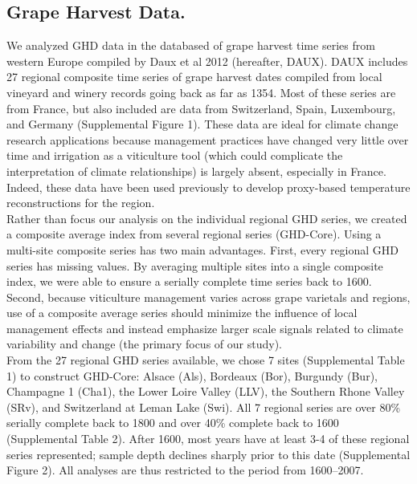 \documentclass[final]{nature}
\begin{document}
\begin{methods}
\subsection{Grape Harvest Data.}
\noindent We analyzed GHD data in the databased of grape harvest time series from western Europe compiled by Daux et al 2012 (hereafter, DAUX\cite{Daux2012}). DAUX includes 27 regional composite time series of grape harvest dates compiled from local vineyard and winery records going back as far as 1354. Most of these series are from France, but also included are data from Switzerland, Spain, Luxembourg, and Germany (Supplemental Figure 1). These data are ideal for climate change research applications because management practices have changed very little over time and irrigation as a viticulture tool (which could complicate the interpretation of climate relationships) is largely absent, especially in France. Indeed, these data have been used previously to develop proxy-based temperature reconstructions for the region\cite{Daux2012}.\\
\indent Rather than focus our analysis on the individual regional GHD series, we created a composite average index from several regional series (GHD-Core). Using a multi-site composite series has two main advantages. First, every regional GHD series has missing values. By averaging multiple sites into a single composite index, we were able to ensure a serially complete time series back to 1600. Second, because viticulture management varies across grape varietals and regions, use of a composite average series should minimize the influence of local management effects and instead emphasize larger scale signals related to climate variability and change (the primary focus of our study).\\
\indent From the 27 regional GHD series available, we chose 7 sites (Supplemental Table 1) to construct GHD-Core: Alsace (Als), Bordeaux (Bor), Burgundy (Bur), Champagne 1 (Cha1), the Lower Loire Valley (LLV), the Southern Rhone Valley (SRv), and Switzerland at Leman Lake (Swi). All 7 regional series are over 80\% serially complete back to 1800 and over 40\% complete back to 1600 (Supplemental Table 2). After 1600, most years have at least 3-4 of these regional series represented; sample depth declines sharply prior to this date (Supplemental Figure 2). All analyses are thus restricted to the period from 1600--2007.\\

\end{methods}
\end{document}

